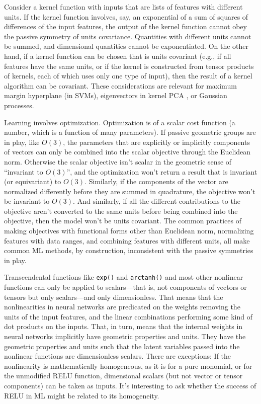 \documentclass{article}
\theoremstyle{plain}
\theoremstyle{definition}
\theoremstyle{remark}
\begin{document}
Consider a kernel function with inputs that are lists of features with different units.
If the kernel function involves, say, an exponential of a sum of squares of differences of the input features, the output of the kernel function cannot obey the passive symmetry of units covariance.
Quantities with different units cannot be summed, and dimensional quantities cannot be exponentiated. 
On the other hand, if a kernel function can be chosen that is units covariant (e.g., if all features have the same units, or if the kernel is constructed from tensor products of kernels, each of which uses only one type of input), then the result of a kernel algorithm can be covariant. These considerations are relevant for maximum margin hyperplane (in SVMs), eigenvectors in kernel PCA \cite{SchSmo02}, or Gaussian processes.

Learning involves optimization.
Optimization is of a scalar cost function (a number, which is a function of many parameters).
If passive geometric groups are in play, like $O(3)$, the parameters that are explicitly or implicitly components of vectors can only be combined into the scalar objective through the Euclidean norm.
Otherwise the scalar objective isn't scalar in the geometric sense of ``invariant to $O(3)$'', and the optimization won't return a result that is invariant (or equivariant) to $O(3)$.
Similarly, if the components of the vector are normalized differently before they are summed in quadrature, the objective won't be invariant to $O(3)$.
And similarly, if all the different contributions to the objective aren't converted to the same units before being combined into the objective, then the model won't be units covariant.
The common practices of making objectives with functional forms other than Euclidean norm, normalizing features with data ranges, and combining features with different units, all make common ML methods, by construction, inconsistent with the passive symmetries in play.

Transcendental functions like \texttt{exp()} and \texttt{arctanh()} and most other nonlinear functions can only be applied to scalars---that is, not components of vectors or tensors but only scalars---and only dimensionless.
That means that the nonlinearities in neural networks are predicated on the weights removing the units of the input features, and the linear combinations performing some kind of dot products on the inputs.
That, in turn, means that the internal weights in neural networks implicitly have geometric properties and units.
They have the geometric properties and units such that the latent variables passed into the nonlinear functions are dimensionless scalars.
There are exceptions:
If the nonlinearity is mathematically homogeneous, as it is for a pure monomial, or for the unmodified RELU function, dimensional scalars (but not vector or tensor components) can be taken as inputs.
It's interesting to ask whether the success of RELU in ML might be related to its homogeneity.
\end{document}
